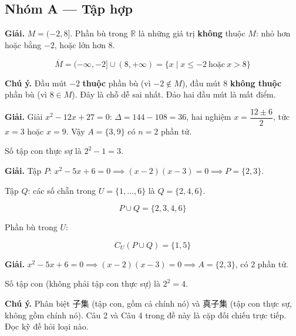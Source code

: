 \documentclass[11pt, a4paper]{article}
\begin{document}

\subsection*{Nhóm A — Tập hợp}

\begin{dapan}[1 — Đáp án A]
\textbf{Giải.} $M = (-2, 8]$. Phần bù trong $\mathbb{R}$ là những giá trị \textbf{không} thuộc $M$: nhỏ hơn hoặc bằng $-2$, hoặc lớn hơn $8$.

$$\overline{M} = (-\infty, -2] \cup (8, +\infty) = \{x \mid x \le -2 \ \text{hoặc} \ x > 8\}$$

\textbf{Chú ý.} Đầu mút $-2$ \textbf{thuộc} phần bù (vì $-2 \notin M$), đầu mút $8$ \textbf{không thuộc} phần bù (vì $8 \in M$). Đây là chỗ dễ sai nhất. Đảo hai đầu mút là mất điểm.
\end{dapan}

\begin{dapan}[2 — Đáp án C]
\textbf{Giải.} Giải $x^2 - 12x + 27 = 0$: $\Delta = 144 - 108 = 36$, hai nghiệm $x = \dfrac{12 \pm 6}{2}$, tức $x = 3$ hoặc $x = 9$. Vậy $A = \{3, 9\}$ có $n = 2$ phần tử.

Số tập con thực sự là $2^2 - 1 = 3$.
\end{dapan}

\begin{dapan}[3 — Đáp án A]
\textbf{Giải.} Tập $P$: $x^2 - 5x + 6 = 0 \implies (x-2)(x-3) = 0 \implies P = \{2, 3\}$.

Tập $Q$: các số chẵn trong $U = \{1,\dots,6\}$ là $Q = \{2, 4, 6\}$.

$$P \cup Q = \{2, 3, 4, 6\}$$

Phần bù trong $U$:

$$C_U(P \cup Q) = \{1, 5\}$$
\end{dapan}

\begin{dapan}[4 — Đáp án D]
\textbf{Giải.} $x^2 - 5x + 6 = 0 \implies (x-2)(x-3) = 0 \implies A = \{2,3\}$, có $2$ phần tử.

Số tập con (không phải tập con thực sự) là $2^2 = 4$.

\textbf{Chú ý.} Phân biệt 子集 (tập con, gồm cả chính nó) và 真子集 (tập con thực sự, không gồm chính nó). Câu 2 và Câu 4 trong đề này là cặp đối chiếu trực tiếp. Đọc kỹ đề hỏi loại nào.
\end{dapan}
\end{document}
